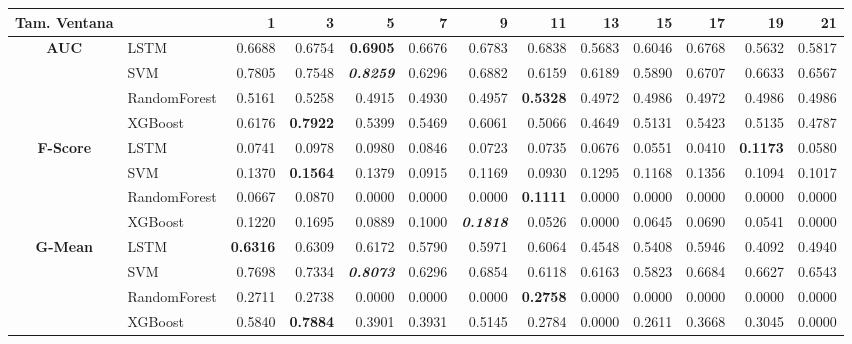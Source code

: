 \begin{table}[H]
	\centering
	\begin{adjustbox}{max width=14cm}
		\begin{tabular}{|c|l|r|r|r|r|r|r|r|r|r|r|r|}
			\hline
			\textbf{Tam. Ventana} &         &      1  &      3  &      5  &      7  &      9  &      11 &      13 &      15 &      17 &      19 &      21 \\
			\hline
			\textbf{AUC} &  LSTM &  0.6688 &  0.6754 & \textbf{  0.6905 } &  0.6676 &  0.6783 &  0.6838 &  0.5683 &  0.6046 &  0.6768 &  0.5632 &  0.5817 \\
			&  SVM &  0.7805 &  0.7548 & \textit{ \textbf{  0.8259 } } &  0.6296 &  0.6882 &  0.6159 &  0.6189 &  0.5890 &  0.6707 &  0.6633 &  0.6567 \\
			&  RandomForest &  0.5161 &  0.5258 &  0.4915 &  0.4930 &  0.4957 & \textbf{  0.5328 } &  0.4972 &  0.4986 &  0.4972 &  0.4986 &  0.4986 \\
			&  XGBoost &  0.6176 & \textbf{  0.7922 } &  0.5399 &  0.5469 &  0.6061 &  0.5066 &  0.4649 &  0.5131 &  0.5423 &  0.5135 &  0.4787 \\
			\hline
			\textbf{F-Score} &  LSTM &  0.0741 &  0.0978 &  0.0980 &  0.0846 &  0.0723 &  0.0735 &  0.0676 &  0.0551 &  0.0410 & \textbf{  0.1173 } &  0.0580 \\
			&  SVM &  0.1370 & \textbf{  0.1564 } &  0.1379 &  0.0915 &  0.1169 &  0.0930 &  0.1295 &  0.1168 &  0.1356 &  0.1094 &  0.1017 \\
			&  RandomForest &  0.0667 &  0.0870 &  0.0000 &  0.0000 &  0.0000 & \textbf{  0.1111 } &  0.0000 &  0.0000 &  0.0000 &  0.0000 &  0.0000 \\
			&  XGBoost &  0.1220 &  0.1695 &  0.0889 &  0.1000 & \textit{ \textbf{  0.1818 } } &  0.0526 &  0.0000 &  0.0645 &  0.0690 &  0.0541 &  0.0000 \\
			\hline
			\textbf{G-Mean} &  LSTM & \textbf{  0.6316 } &  0.6309 &  0.6172 &  0.5790 &  0.5971 &  0.6064 &  0.4548 &  0.5408 &  0.5946 &  0.4092 &  0.4940 \\
			&  SVM &  0.7698 &  0.7334 & \textit{ \textbf{  0.8073 } } &  0.6296 &  0.6854 &  0.6118 &  0.6163 &  0.5823 &  0.6684 &  0.6627 &  0.6543 \\
			&  RandomForest &  0.2711 &  0.2738 &  0.0000 &  0.0000 &  0.0000 & \textbf{  0.2758 } &  0.0000 &  0.0000 &  0.0000 &  0.0000 &  0.0000 \\
			&  XGBoost &  0.5840 & \textbf{  0.7884 } &  0.3901 &  0.3931 &  0.5145 &  0.2784 &  0.0000 &  0.2611 &  0.3668 &  0.3045 &  0.0000 \\

\end{tabular}
\end{adjustbox}
\end{table}
